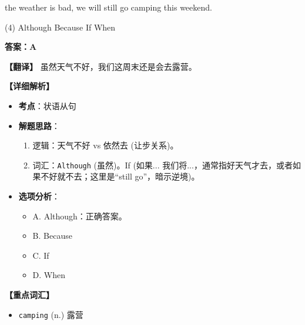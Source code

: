 \documentclass[11pt, a4paper]{article}
\newcommand{\analysis}[4]{
    \begin{solutionbox}
        \textbf{答案：#1}
        
        \textbf{【翻译】} #2
        
        \textbf{【详细解析】}
        #3
        
        \textbf{【重点词汇】}
        #4
    \end{solutionbox}
}
\newcommand{\blank}{\underline{\hspace{1.5cm}}}
\begin{document}
\begin{questions}
    \item \blank the weather is bad, we will still go camping this weekend.
    \begin{tasks}(4)
        \task Although \task Because \task If \task When
    \end{tasks}
    \analysis{A}{虽然天气不好，我们这周末还是会去露营。}{
        \begin{itemize}
            \item \textbf{考点}：状语从句
            \item \textbf{解题思路}：
                \begin{enumerate}
                    \item 逻辑：天气不好 vs 依然去 (让步关系)。
                    \item 词汇：\texttt{Although} (虽然)。If (如果... 我们将...，通常指好天气才去，或者如果不好就不去；这里是“still go”，暗示逆境)。
                \end{enumerate}
            \item \textbf{选项分析}：
                \begin{itemize}
                    \item A. Although：正确答案。
                    \item B. Because
                    \item C. If
                    \item D. When
                \end{itemize}
        \end{itemize}
    }{
        \begin{itemize}
            \item \texttt{camping} (n.) 露营
        \end{itemize}
    }


\end{questions}
\end{document}
